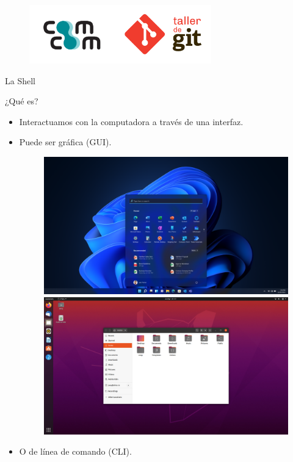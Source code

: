 


\begin{frame}
  \titlepage
  \begin{figure}[ht]
      \begin{center}
          \includegraphics[height=1in]{images/logo-taller.png}
      \end{center}
  \end{figure}
\end{frame}

\begin{frame}{La Shell}
\begin{block}{¿Qué es?}
    \begin{itemize}
        \item Interactuamos con la computadora a través de una interfaz.
        \pause
        \item Puede ser gráfica (GUI).
            \begin{figure}
            \begin{minipage}{.5\textwidth}
              \includegraphics[width=.8\linewidth]{images/windows-gui.png}
            \end{minipage}%
            \begin{minipage}{.5\textwidth}
              \includegraphics[width=.8\linewidth]{images/ubuntu-gui.jpg}
            \end{minipage}
            \end{figure}
        \pause
        \item O de línea de comando (CLI).
    \end{itemize}
\end{block}

\end{frame}

